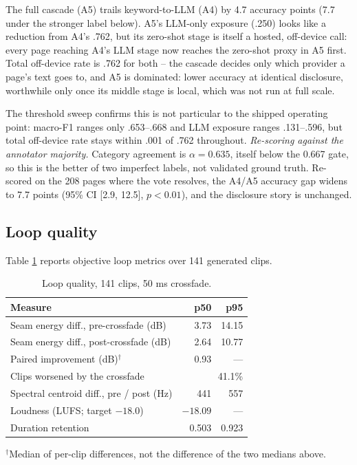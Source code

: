 \documentclass[conference]{IEEEtran}
\let\IEEEoriginalcaption\caption
\renewcommand{\caption}[1]{\IEEEoriginalcaption{\footnotesize #1}}
\begin{document}
The full cascade (A5) trails keyword-to-LLM (A4) by 4.7 accuracy points
(7.7 under the stronger label below). A5's LLM-only exposure (.250) looks
like a reduction from A4's .762, but its zero-shot stage is itself a
hosted, off-device call: every page reaching A4's LLM stage now reaches
the zero-shot proxy in A5 first. Total off-device rate is .762 for both
-- the cascade decides only which provider a page's text goes to, and A5
is dominated: lower accuracy at identical disclosure, worthwhile only once
its middle stage is local, which was not run at full scale.

The threshold sweep confirms this is not particular to the shipped
operating point: macro-F1 ranges only .653--.668 and LLM exposure ranges
.131--.596, but total off-device rate stays within .001 of .762
throughout. \emph{Re-scoring against the annotator majority.} Category
agreement is $\alpha=0.635$, itself below the 0.667 gate, so this is the
better of two imperfect labels, not validated ground truth. Re-scored on
the 208 pages where the vote resolves, the A4/A5 accuracy gap widens to
7.7 points (95\% CI [2.9, 12.5], $p<0.01$), and the disclosure story is
unchanged.

\subsection{Loop quality}
\label{sec:res-loop}

Table \ref{tab:seam} reports objective loop metrics over 141 generated
clips.

\begin{table}[t]
\caption{Loop quality, 141 clips, 50 ms crossfade.}
\label{tab:seam}
\begin{center}
\scriptsize
\begin{tabular}{lrr}
\toprule
\textbf{Measure} & \textbf{p50} & \textbf{p95} \\
\midrule
Seam energy diff., pre-crossfade (dB) & 3.73 & 14.15 \\
Seam energy diff., post-crossfade (dB) & 2.64 & 10.77 \\
Paired improvement (dB)$^{\dagger}$ & 0.93 & --- \\
Clips worsened by the crossfade & \multicolumn{2}{r}{41.1\%} \\
Spectral centroid diff., pre / post (Hz) & 441 & 557 \\
Loudness (LUFS; target $-18.0$) & $-18.09$ & --- \\
Duration retention & 0.503 & 0.923 \\
\bottomrule
\end{tabular}
\end{center}
{\scriptsize $^{\dagger}$Median of per-clip differences, not the
difference of the two medians above.}
\end{table}
\end{document}

